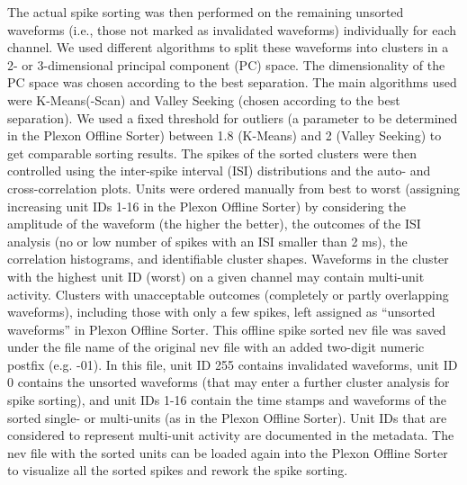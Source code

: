 The actual spike sorting was then performed on the remaining unsorted waveforms (i.e., those not marked as invalidated waveforms) individually for each channel. We used different algorithms to split these waveforms into clusters in a 2- or 3-dimensional principal component (PC) space. The dimensionality of the PC space was chosen according to the best separation. The main algorithms used were K-Means(-Scan) and Valley Seeking (chosen according to the best separation). We used a fixed threshold for outliers (a parameter to be determined in the Plexon Offline Sorter) between 1.8 (K-Means) and 2 (Valley Seeking) to get comparable sorting results. The spikes of the sorted clusters were then controlled using the inter-spike interval (ISI) distributions and the auto- and cross-correlation plots. Units were ordered manually from best to worst (assigning increasing unit IDs 1-16 in the Plexon Offline Sorter) by considering the amplitude of the waveform (the higher the better), the outcomes of the ISI analysis (no or low number of spikes with an ISI smaller than 2 ms), the correlation histograms, and identifiable cluster shapes. Waveforms in the cluster with the highest unit ID (worst) on a given channel may contain multi-unit activity. Clusters with unacceptable outcomes (completely or partly overlapping waveforms), including those with only a few spikes, left assigned as “unsorted waveforms” in Plexon Offline Sorter. This offline spike sorted nev file was saved under the file name of the original nev file with an added two-digit numeric postfix (e.g. -01). In this file, unit ID 255 contains invalidated waveforms, unit ID 0 contains the unsorted waveforms (that may enter a further cluster analysis for spike sorting), and unit IDs 1-16 contain the time stamps and waveforms of the sorted single- or multi-units (as in the Plexon Offline Sorter). Unit IDs that are considered to represent multi-unit activity are documented in the metadata. The nev file with the sorted units can be loaded again into the Plexon Offline Sorter to visualize all the sorted spikes and rework the spike sorting.

